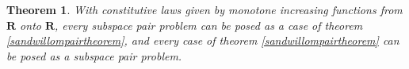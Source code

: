 \documentclass{article}
\def\Reals{\ensuremath{\mathbf R}}
\newtheorem{theorem}{Theorem}
\begin{document}
\begin{theorem}
With constitutive laws given by monotone increasing functions from $\Reals$ onto
$\Reals$, every subspace pair problem can be posed as a case of theorem
\ref{sandwillompairtheorem}, and every case of theorem
\ref{sandwillompairtheorem} can be posed as a subspace pair problem.
\end{theorem}



%

\end{document}
